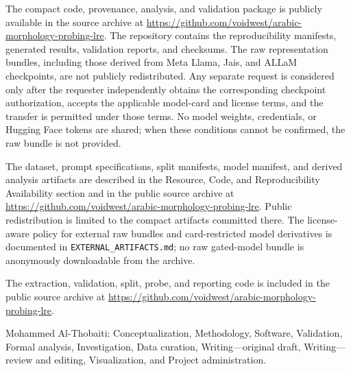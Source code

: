 \documentclass[pdflatex,sn-basic]{sn-jnl}
\begin{document}
The compact code, provenance, analysis, and validation package is publicly
available in the source archive at
\url{https://github.com/voidwest/arabic-morphology-probing-lre}. The repository
contains the reproducibility manifests, generated results, validation reports,
and checksums. The raw representation bundles, including those derived from
Meta Llama, Jais, and ALLaM checkpoints, are not publicly redistributed. Any
separate request is considered only after the requester independently obtains
the corresponding checkpoint authorization, accepts the applicable model-card
and license terms, and the transfer is permitted under those terms. No model
weights, credentials, or Hugging Face tokens are shared; when these conditions
cannot be confirmed, the raw bundle is not provided.

The dataset, prompt specifications, split manifests, model manifest, and
derived analysis artifacts are described in the Resource, Code, and
Reproducibility Availability section and in the public source archive at
\url{https://github.com/voidwest/arabic-morphology-probing-lre}. Public
redistribution is limited to the compact artifacts committed there. The
license-aware policy for external raw bundles and card-restricted model
derivatives is documented in \texttt{EXTERNAL\_ARTIFACTS.md}; no raw gated-model
bundle is anonymously downloadable from the archive.

The extraction, validation, split, probe, and reporting code is included in
the public source archive at
\url{https://github.com/voidwest/arabic-morphology-probing-lre}.

Mohammed Al-Thobaiti: Conceptualization, Methodology, Software, Validation,
Formal analysis, Investigation, Data curation, Writing---original draft,
Writing---review and editing, Visualization, and Project administration.


\end{document}
